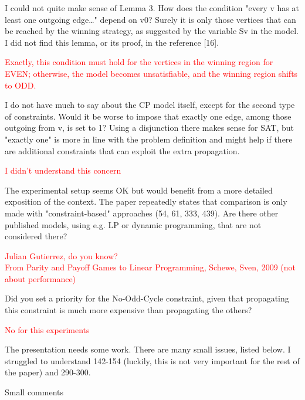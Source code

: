 \documentclass{article}
\begin{document}
I could not quite make sense of Lemma 3. How does the condition "every v has at least one outgoing edge…" depend on v0? Surely it is only those vertices that can be reached by the winning strategy, as suggested by the variable Sv in the model. I did not find this lemma, or its proof, in the reference [16].

\textcolor{red}{Exactly, this condition must hold for the vertices in the winning region for EVEN; otherwise, the model becomes unsatisfiable, and the winning region shifts to ODD.}

I do not have much to say about the CP model itself, except for the second type of constraints. Would it be worse to impose that exactly one edge, among those outgoing from v, is set to 1? Using a disjunction there makes sense for SAT, but "exactly one" is more in line with the problem definition and might help if there are additional constraints that can exploit the extra propagation.

\textcolor{red}{I didn't understand this concern}

The experimental setup seems OK but would benefit from a more detailed exposition of the context. The paper repeatedly states that comparison is only made with "constraint-based" approaches (54, 61, 333, 439). Are there other published models, using e.g. LP or dynamic programming, that are not considered there? 

\textcolor{red}{Julian Gutierrez, do you know? \\
From Parity and Payoff Games to Linear Programming, Schewe, Sven, 2009 (not about performance) \\
}


Did you set a priority for the No-Odd-Cycle constraint, given that propagating this constraint is much more expensive than propagating the others?

\textcolor{red}{No for this experiments}

The presentation needs some work. There are many small issues, listed below. I struggled to understand 142-154 (luckily, this is not very important for the rest of the paper) and 290-300.

Small comments
\end{document}
